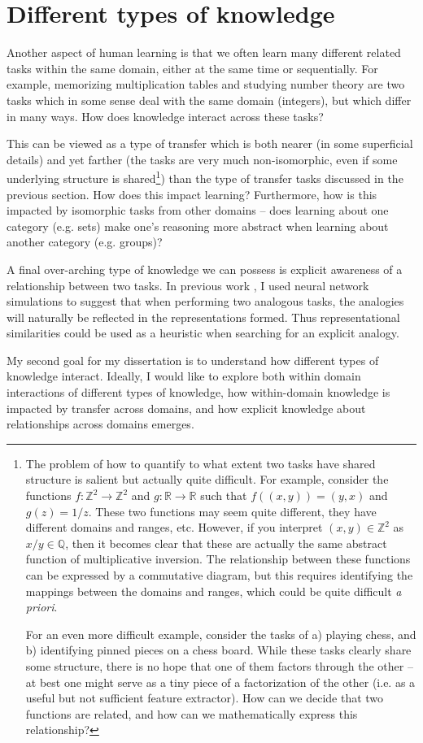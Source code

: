 \documentclass[11pt]{article}
\newcommand{\Ints}{\mathbb{Z}}
\newcommand{\Rats}{\mathbb{Q}}
\newcommand{\Reals}{\mathbb{R}}
\begin{document}
\section{Different types of knowledge}
Another aspect of human learning is that we often learn many different related tasks within the same domain, either at the same time or sequentially. For example, memorizing multiplication tables and studying number theory are two tasks which in some sense deal with the same domain (integers), but which differ in many ways. How does knowledge interact across these tasks? \par
This can be viewed as a type of transfer which is both nearer (in some superficial details) and yet farther (the tasks are very much non-isomorphic, even if some underlying structure is shared\footnote{The problem of how to quantify to what extent two tasks have shared structure is salient but actually quite difficult. For example, consider the functions \(f: \Ints^2 \rightarrow \Ints^2\) and \(g: \Reals \rightarrow \Reals\) such that \(f((x,y)) = (y, x)\) and \(g(z) = 1/z\). These two functions may seem quite different, they have different domains and ranges, etc. However, if you interpret \((x,y) \in \Ints^2\) as \(x/y \in \Rats\), then it becomes clear that these are actually the same abstract function of multiplicative inversion. The relationship between these functions can be expressed by a commutative diagram, but this requires identifying the mappings between the domains and ranges, which could be quite difficult \emph{a priori}.\par
For an even more difficult example, consider the tasks of a) playing chess, and b) identifying pinned pieces on a chess board. While these tasks clearly share some structure, there is no hope that one of them factors through the other -- at best one might serve as a tiny piece of a factorization of the other (i.e. as a useful but not sufficient feature extractor). How can we decide that two functions are related, and how can we mathematically express this relationship?}) than the type of transfer tasks discussed in the previous section. How does this impact learning? Furthermore, how is this impacted by isomorphic tasks from other domains -- does learning about one category (e.g. sets) make one's reasoning more abstract when learning about another category (e.g. groups)? \par 
A final over-arching type of knowledge we can possess is explicit awareness of a relationship between two tasks. In previous work \citep{Lampinen2017a}, I used neural network simulations to suggest that when performing two analogous tasks, the analogies will naturally be reflected in the representations formed. Thus representational similarities could be used as a heuristic when searching for an explicit analogy. \par
My second goal for my dissertation is to understand how different types of knowledge interact. Ideally, I would like to explore both within domain interactions of different types of knowledge, how within-domain knowledge is impacted by transfer across domains, and how explicit knowledge about relationships across domains emerges. \par 
\end{document}
